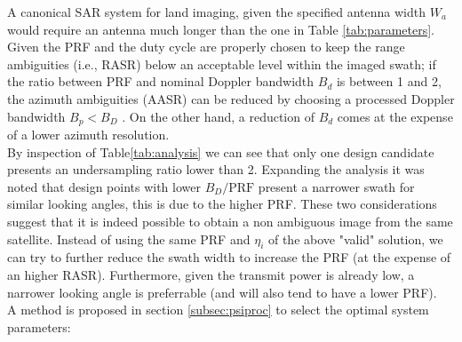 \documentclass[conference,a4paper]{IEEEtran}
\begin{document}
    A canonical SAR system for land imaging, given the specified antenna width $W_a$ would require an antenna much longer than the one in Table \ref{tab:parameters}.
    Given the PRF and the duty cycle are properly chosen to keep the range ambiguities (i.e., RASR) below an acceptable level within the imaged swath;
    if the ratio between PRF and nominal Doppler bandwidth $B_d$ is between 1 and 2, the azimuth ambiguities (AASR) can be reduced by choosing a processed Doppler bandwidth $B_p < B_D$  \cite{freeman2018design}.
    On the other hand, a reduction of $B_d$ comes at the expense of a lower azimuth resolution.\\
    By inspection of Table\ref{tab:analysis} we can see that only one design candidate presents an undersampling ratio lower than 2.
    Expanding the analysis it was noted that design points with lower $B_D/\text{PRF}$ present a narrower swath for similar looking angles, this is due to the higher PRF.
    These two considerations suggest that it is indeed possible to obtain a non ambiguous image from the same satellite.
    Instead of using the same PRF and $\eta_i$ of the above "valid" solution, we can try to further reduce the swath width to increase the PRF (at the expense of an higher RASR).
    Furthermore, given the transmit power is already low, a narrower looking angle is preferrable (and will also tend to have a lower PRF).\\
    A method is proposed in section \ref{subsec:psiproc} to select the optimal system parameters:
\end{document}

